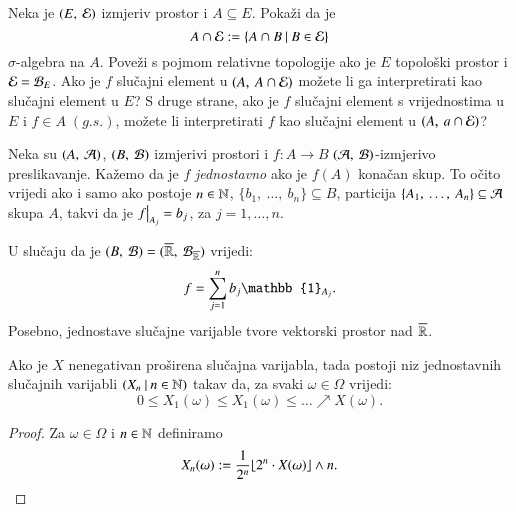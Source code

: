 \begin{zad} \label{zad:3.15}
    Neka je $(E, \: \mathcal{E})$ izmjeriv prostor i $A \subseteq E$.
    Poka\v zi da je
    \begin{equation*}
        A \cap \mathcal{E} := \{{A \cap B} \: | \: {B \in \mathcal{E}}\}
    \end{equation*}
    $\sigma$-algebra na $A$.
    Pove\v zi s pojmom relativne topologije ako je $E$ topolo\v ski prostor i $\mathcal{E} = \mathcal{B}_{E}$.
    Ako je $f$ slu\v cajni element u $(A, \: A \cap \mathcal{E})$ mo\v zete li ga interpretirati kao slu\v cajni element u $E$?
    S druge strane, ako je $f$ slu\v cajni element s vrijednostima u $E$ i $f \in A \; (g.s.)$, mo\v zete li interpretirati $f$ kao slu\v cajni element u $(A, \: a \cap \mathcal{E})$?
\end{zad}


\begin{pr}  \label{pr:3.16}
    Neka su $(A, \: \mathcal{A})$, $(B, \: \mathcal{B})$ izmjerivi prostori i $f: A \to B$ $(\mathcal{A}, \: \mathcal{B})$-izmjerivo preslikavanje.
    Ka\v zemo da je $f$ \emph{jednostavno} ako je $f(A)$ kona\v can skup. To o\v cito vrijedi ako i samo ako postoje $n \in \mathbb{N}$, $\{ b_1, \: \dots, \: b_n \} \subseteq B$, particija $\{ A_1, \: \dots, \: A_n \} \subseteq \mathcal{A}$ skupa $A$, takvi da je $\restr{f}{A_j} = b_j$, za $j = 1, \dots, n$.
    
    U slu\v caju da je $(B, \: \mathcal{B}) = (\overline{\mathbb{R}}, \: \mathcal{B}_{\overline{\mathbb{R}}})$ vrijedi:
    \begin{equation*}
        f = \suma{j = 1}{n} b_j \mathbb{1}_{A_j}.
    \end{equation*}
    Posebno, jednostave slu\v cajne varijable tvore vektorski prostor nad $\overline{\mathbb{R}}$.
\end{pr}

\begin{lm}  \label{lm:3.17}
    Ako je $X$ nenegativan pro\v sirena slu\v cajna varijabla, tada postoji niz jednostavnih slu\v cajnih varijabli $({X_n} \: | \: {n \in \mathbb{N}})$ takav da, za svaki $\omega \in \Omega$ vrijedi:
    \begin{equation*}
        0 \leq X_1(\omega) \leq X_1(\omega) \leq  \dots \nearrow X(\omega).
    \end{equation*} 
\end{lm}

\begin{proof}
    Za $\omega \in \Omega$ i $n \in \mathbb{N}$ definiramo
    \begin{equation*}
        X_n(\omega) := \frac{1}{2^n} \floor*{2^n \cdot X(\omega)} \land n.
    \end{equation*}
\end{proof}

